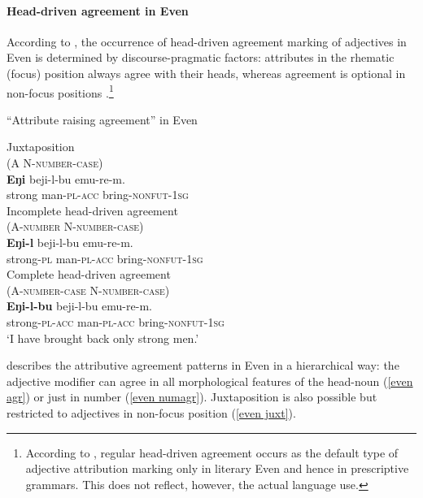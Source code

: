 \paragraph*{Head\hyp{}driven agreement in Even}
According to \citet[20]{malchukov1995}, the occurrence of head\hyp{}driven agreement marking of adjectives in Even is determined by discourse-pragmatic factors: attributes in the rhematic (focus) position always agree with their heads, whereas agreement is optional in non-focus positions \citep[31–32]{malchukov1995}.\footnote{According to \citet[31]{malchukov1995}, regular head\hyp{}driven agreement occurs as the default type of adjective attribution marking only in literary Even and hence in prescriptive grammars. This does not reflect, however, the actual language use.}
\begin{exe}
\ex
\label{even raising}
{\rm “Attribute raising agreement” in Even \citep[30–31]{malchukov1995}}
\begin{xlist}
\ex
\label{even juxt}
{\rm Juxtaposition}\\
{\rm (A N-\textsc{number}-\textsc{case})}\\
\gll	\textbf{Eŋi} beji-l-bu emu-re-m.\\
	strong man-\textsc{pl}-\textsc{acc} bring-\textsc{nonfut}-\textsc{1sg}\\

\ex
\label{even numagr}	
{\rm Incomplete head\hyp{}driven agreement}\\
{\rm (A-\textsc{number} N-\textsc{number}-\textsc{case})}\\
\gll	\textbf{Eŋi-l} beji-l-bu emu-re-m.\\
	strong-\textsc{pl} man-\textsc{pl}-\textsc{acc} bring-\textsc{nonfut}-\textsc{1sg}\\

\ex
\label{even agr}	
{\rm Complete head\hyp{}driven agreement}\\
{\rm (A-\textsc{number}-\textsc{case} N-\textsc{number}-\textsc{case})}\\
\gll	\textbf{Eŋi-l-bu} beji-l-bu emu-re-m.\\
	strong-\textsc{pl}-\textsc{acc} man-\textsc{pl}-\textsc{acc} bring-\textsc{nonfut}-\textsc{1sg}\\
\glt	‘I have brought back only strong men.’
\end{xlist}
\end{exe}
\citet[30–31]{malchukov1995} describes the attributive agreement patterns in Even in a hierarchical way: the adjective modifier can agree in all morphological features of the head-noun (\ref{even agr}) or just in number (\ref{even numagr}). Juxtaposition is also possible but restricted to adjectives in non-focus position (\ref{even juxt}).

